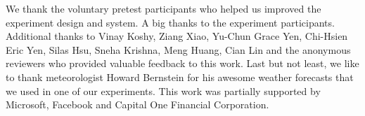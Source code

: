 \begin{acks}
We thank the voluntary pretest participants who helped us improved the experiment design and system. A big thanks to the experiment participants. Additional thanks to Vinay Koshy, Ziang Xiao, Yu-Chun Grace Yen, Chi-Hsien Eric Yen, Silas Hsu, Sneha Krishna, Meng Huang, Cian Lin and the anonymous reviewers who provided valuable feedback to this work. Last but not least, we like to thank meteorologist Howard Bernstein for his awesome weather forecasts that we used in one of our experiments. This work was partially supported by Microsoft, Facebook and Capital One Financial Corporation. 
\end{acks}